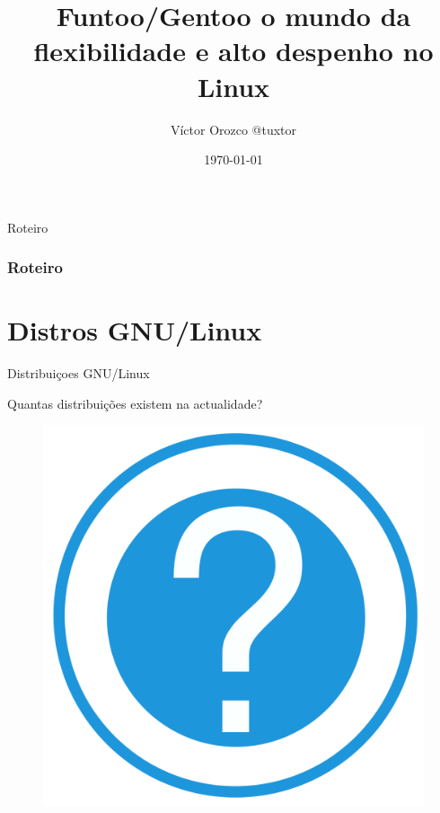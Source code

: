 \documentclass{beamer}
\title{Funtoo/Gentoo o mundo da flexibilidade e alto despenho no Linux}
\author[Lopez. V.L.O]{Víctor Orozco @tuxtor}
\date{\today}
\begin{document}
\begin{frame}[Plain]
\titlepage
\end{frame}

\begin{frame}{Roteiro}
\frametitle{Roteiro}
\tableofcontents
\end{frame} 

\section{Distros GNU/Linux}
\begin{frame}{Distribuiçoes GNU/Linux}
\begin{center}
Quantas distribuições existem na actualidade?
\end{center}
\begin{figure}[tbph]
\centering
\includegraphics[width=0.3\linewidth]{./question}
\label{fig:question}
\end{figure}
\end{frame}
\end{document}
